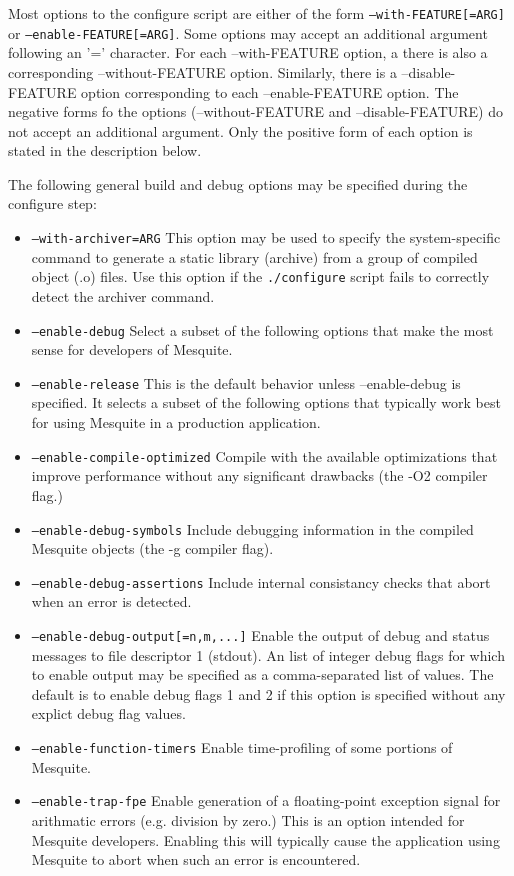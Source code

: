 \documentclass[letter]{report}
\begin{document}
Most options to the configure script are either of the form \texttt{--with-FEATURE[=ARG]} or
\texttt{--enable-FEATURE[=ARG]}.  Some options may accept an additional argument following 
an '=' character.  For each --with-FEATURE option, a there is also a corresponding
--without-FEATURE option.  Similarly, there is a --disable-FEATURE option 
corresponding to each --enable-FEATURE option.  The negative forms fo the options 
(--without-FEATURE and --disable-FEATURE) do not accept an additional argument.  
Only the positive form of each option is stated in the description below.  

\label{config_options}
The following general build and debug options may be specified during the configure step:
\begin{itemize}
\item \texttt{--with-archiver=ARG}  This option may be used to specify the
system-specific command to generate a static library (archive) from a group
of compiled object (.o) files.  Use this option if the \texttt{./configure} script fails to correctly detect the archiver command.
\item \texttt{--enable-debug}  Select a subset of the following options that
make the most sense for developers of Mesquite.
\item \texttt{--enable-release}  This is the default behavior unless 
--enable-debug is specified.  It selects a subset of the following options that
typically work best for using Mesquite in a production application.
\item \texttt{--enable-compile-optimized} Compile with the available 
optimizations that improve performance without any significant drawbacks 
(the -O2 compiler flag.)
\item \texttt{--enable-debug-symbols} Include debugging information in
the compiled Mesquite objects (the -g compiler flag).
\item \texttt{--enable-debug-assertions}  Include internal consistancy 
checks that abort when an error is detected.
\item \texttt{--enable-debug-output[=n,m,...]}  Enable the output of
debug and status messages to file descriptor 1 (stdout).  An 
list of integer debug flags for which to enable output may be specified 
as a comma-separated list of values.  The default is to enable debug
flags 1 and 2 if this option is specified without any explict debug
flag values.
\item \texttt{--enable-function-timers}  Enable time-profiling of
some portions of Mesquite.
\item \texttt{--enable-trap-fpe}  Enable generation of a floating-point
exception signal for arithmatic errors (e.g. division by zero.)  This is
an option intended for Mesquite developers.  Enabling this will typically cause
the application using Mesquite to abort when such an error is encountered.
\end{itemize}
\end{document}
